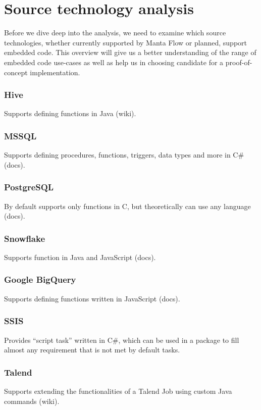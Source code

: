 \section{Source technology analysis}

Before we dive deep into the analysis, we need to examine which source technologies, whether currently supported by Manta Flow or planned, support embedded code. This overview will give us a better understanding of the range of embedded code use-cases as well as help us in choosing  candidate for a proof-of-concept implementation.

\subsubsection{Hive}
Supports defining functions in Java (wiki).

\subsubsection{MSSQL}
Supports defining procedures, functions, triggers, data types and more in C\# (docs).

\subsubsection{PostgreSQL}
By default supports only functions in C, but theoretically can use any language (docs).

\subsubsection{Snowflake}
Supports function in Java and JavaScript (docs).

\subsubsection{Google BigQuery}
Supports defining functions written in JavaScript (docs).

\subsubsection{SSIS}
Provides “script task” written in C\#, which can be used in a package to fill almost any requirement that is not met by default tasks.

\subsubsection{Talend}
Supports extending the functionalities of a Talend Job using custom Java commands (wiki).

